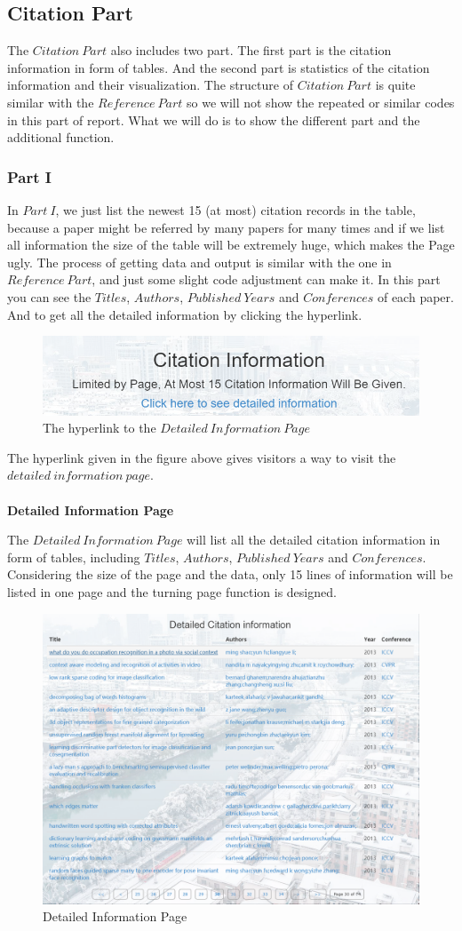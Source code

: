 \documentclass{article}
\begin{document}
	\subsection{Citation Part}
	The \(Citation\ Part\) also includes two part. The first part is the citation information in form of tables. And the second part is statistics of the citation information and their visualization. The structure of \(Citation\ Part\) is quite similar with the \(Reference\ Part\) so we will not show the repeated or similar codes in this part of report. What we will do is to show the different part and the additional function.
	\subsubsection{Part I}
	In \(Part\ I\), we just list the newest 15 (at most) citation records in the table, because a paper might be referred by many papers for many times and if we list all information the size of the table will be extremely huge, which makes the Page ugly. The process of getting data and output is similar with the one in \(Reference\ Part\), and just some slight code adjustment can make it. In this part you can see the \(Titles\), \(Authors\), \(Published\ Years\) and \(Conferences\) of each paper. And to get all the detailed information by clicking the hyperlink.
	\begin{figure}[H]
		\centering
		\includegraphics[width=0.6\linewidth]{P_20.png}
		\caption{The hyperlink to the \(Detailed\ Information\ Page\)}
	\end{figure}
	The hyperlink given in the figure above gives visitors a way to visit the \(detailed\ information\ page\).
	\\
	\\
	\textbf{Detailed Information Page}
	\par The \(Detailed\ Information\ Page\) will list all the detailed citation information in form of tables, including \(Titles\), \(Authors\), \(Published\ Years\) and \(Conferences\). Considering the size of the page and the data, only 15 lines of information will be listed in one page and the turning page function is designed.
	\begin{figure}[H]
		\centering
		\includegraphics[width=0.7\linewidth]{p_21.png}
		\caption{Detailed Information Page}
	\end{figure}
\end{document}
